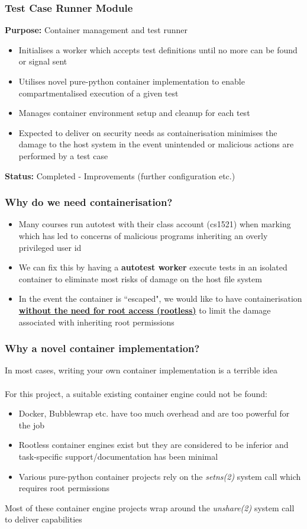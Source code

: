 \documentclass[xcolor, handout]{beamer}
\begin{document}
\begin{frame}
	\frametitle{Test Case Runner Module}
	\textbf{Purpose:} Container management and test runner\\
	\begin{itemize}
		\item Initialises a worker which accepts test definitions until no more can be found or signal sent
			\pause
		\item Utilises novel pure-python container implementation to enable compartmentalised execution of a given test
			\pause
		\item Manages container environment setup and cleanup for each test
			\pause
		\item Expected to deliver on security needs as containerisation minimises the damage to the host system in the event unintended or malicious actions are performed by a test case
			\pause
	\end{itemize}
	\textbf{Status:} Completed - Improvements (further configuration etc.)
\end{frame}
\begin{frame}
	\frametitle{Why do we need containerisation?}
	\begin{itemize}
		\setlength\itemsep{1em}
		\item Many courses run autotest with their class account (cs1521) when marking which has led to concerns of malicious programs inheriting an overly privileged user id
			\pause
		\item We can fix this by having a \textbf{autotest worker} execute tests in an isolated container to eliminate most risks of damage on the host file system
			\pause
		\item In the event the container is ``escaped", we would like to have containerisation \textbf{\underline{without the need for root access (rootless)}} to limit the damage associated with inheriting root permissions
	\end{itemize}
\end{frame}
\begin{frame}
	\frametitle{Why a novel container implementation?}
	In most cases, writing your own container implementation is a terrible idea
	\pause
	\\~\\
	For this project, a suitable existing container engine could not be found:
	\begin{itemize}
		\setlength\itemsep{1em}
		\item Docker, Bubblewrap etc. have too much overhead and are too powerful for the job
			\pause
		\item Rootless container engines exist but they are considered to be inferior and task-specific support/documentation has been minimal
			\pause
		\item Various pure-python container projects rely on the \textit{setns(2)} system call which requires root permissions
			\pause
	\end{itemize}
	Most of these container engine projects wrap around the \textit{unshare(2)} system call to deliver capabilities
\end{frame}
\end{document}
